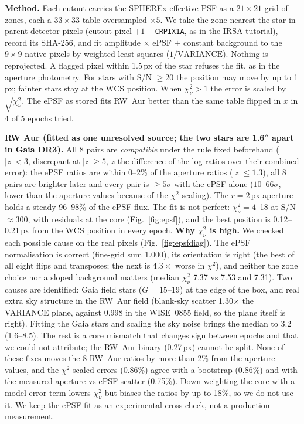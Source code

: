 \documentclass[11pt,a4paper]{article}
\begin{document}
\textbf{Method.} Each cutout carries the SPHEREx effective PSF as a $21\times21$ grid of zones, each a $33\times33$ table
oversampled $\times5$. We take the zone nearest the star in parent-detector pixels (cutout pixel $+1-$\texttt{CRPIX1A},
as in the IRSA tutorial), record its SHA-256, and fit amplitude $\times$ ePSF $+$ constant background to the $9\times9$
native pixels by weighted least squares ($1/\mathrm{VARIANCE}$). Nothing is reprojected. A flagged pixel within 1.5\,px
of the star refuses the fit, as in the aperture photometry. For stars with S/N $\ge20$ the position may move by up to
1\,px; fainter stars stay at the WCS position. When $\chi^2_\nu>1$ the error is scaled by $\sqrt{\chi^2_\nu}$.
The ePSF as stored fits RW~Aur better than the same table flipped in $x$ in 4 of 5 epochs tried.

\textbf{RW Aur (fitted as one unresolved source; the two stars are 1.6$''$ apart in Gaia DR3).} All 8 pairs are
\emph{compatible} under the rule fixed beforehand ($|z|<3$, discrepant at $|z|\ge5$, $z$ the difference of the
log-ratios over their combined error): the ePSF ratios are within 0--2\% of the aperture ratios ($|z|\le1.3$),
all 8 pairs are brighter later and every pair is $\ge5\sigma$ with the ePSF alone ($10$--$66\sigma$, lower than the
aperture values because of the $\chi^2$ scaling). The $r=2$\,px aperture holds a steady 96--98\% of the ePSF flux.
The fit is not perfect: $\chi^2_\nu=4$--18 at S/N $\approx300$, with residuals at the core
(Fig.~\ref{fig:epsf}), and the best position is 0.12--0.21\,px from the WCS position in every epoch.
\textbf{Why $\chi^2_\nu$ is high.} We checked each possible cause on the real pixels (Fig.~\ref{fig:epsfdiag}).
The ePSF normalisation is correct (fine-grid sum 1.000), its orientation is right (the best of all eight flips and
transposes; the next is $4.3\times$ worse in $\chi^2$), and neither the zone choice nor a sloped background matters
(median $\chi^2_\nu$ 7.37 vs 7.53 and 7.31). Two causes are identified: Gaia field stars ($G=15$--19) at the edge of the
box, and real extra sky structure in the RW~Aur field (blank-sky scatter 1.30$\times$ the VARIANCE plane, against
0.998 in the WISE~0855 field, so the plane itself is right). Fitting the Gaia stars and scaling the sky noise brings the
median to 3.2 (1.6--8.5). The rest is a core mismatch that changes sign between epochs and that we could not attribute;
the RW~Aur binary (0.27\,px) cannot be split. None of these fixes moves the 8 RW~Aur ratios by more than 2\% from the
aperture values, and the $\chi^2$-scaled errors (0.86\%) agree with a bootstrap (0.86\%) and with the measured
aperture-vs-ePSF scatter (0.75\%). Down-weighting the core with a model-error term lowers $\chi^2_\nu$ but biases the
ratios by up to 18\%, so we do not use it. We keep the ePSF fit as an experimental cross-check, not a production
measurement.
\end{document}
